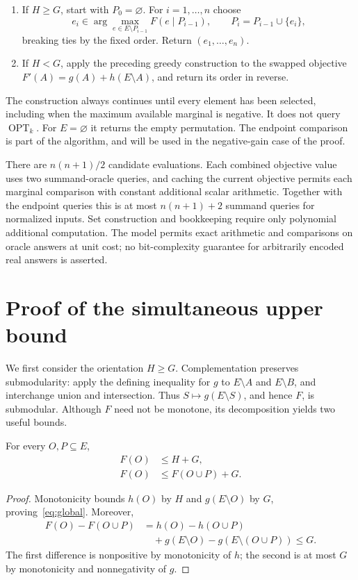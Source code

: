 \documentclass[acmsmall,screen,nonacm,11pt,natbib=false]{acmart}
\newcommand{\OPT}{\operatorname{OPT}}
\begin{document}
\begin{enumerate}
\item If $H\ge G$, start with $P_0=\varnothing$. For $i=1,\ldots,n$ choose
\[
 e_i\in\arg\max_{e\in E\setminus P_{i-1}}F(e\mid P_{i-1}),
 \qquad P_i=P_{i-1}\cup\{e_i\},
\]
breaking ties by the fixed order. Return $(e_1,\ldots,e_n)$.
\item If $H<G$, apply the preceding greedy construction to the swapped
objective $F'(A)=g(A)+h(E\setminus A)$, and return its order in reverse.
\end{enumerate}

The construction always continues until every element has been selected,
including when the maximum available marginal is negative. It does not
query $\OPT_k$. For $E=\varnothing$ it returns the empty permutation.
The endpoint comparison is part of the algorithm, and will be used in the
negative-gain case of the proof.

There are $n(n+1)/2$ candidate evaluations. Each combined objective value
uses two summand-oracle queries, and caching the current objective permits
each marginal comparison with constant additional scalar arithmetic.
Together with the endpoint queries this is at most $n(n+1)+2$ summand
queries for normalized inputs. Set construction and bookkeeping require
only polynomial additional computation. The model permits exact arithmetic
and comparisons on oracle answers at unit cost; no bit-complexity guarantee
for arbitrarily encoded real answers is asserted.

\section{Proof of the simultaneous upper bound}\label{sec:proof}

We first consider the orientation $H\ge G$. Complementation preserves
submodularity: apply the defining inequality for $g$ to $E\setminus A$
and $E\setminus B$, and interchange union and intersection. Thus
$S\mapsto g(E\setminus S)$, and hence $F$, is submodular. Although $F$
need not be monotone, its decomposition yields two useful bounds.

\begin{lemma}\label{lem:budget}
For every $O,P\subseteq E$,
\begin{align}
 F(O)&\le H+G,\label{eq:global}\\
 F(O)&\le F(O\cup P)+G.\label{eq:union}
\end{align}
\end{lemma}
\begin{proof}
Monotonicity bounds $h(O)$ by $H$ and $g(E\setminus O)$ by $G$,
proving~\eqref{eq:global}. Moreover,
\begin{align*}
 F(O)-F(O\cup P)
 &=h(O)-h(O\cup P)\\
 &\quad+g(E\setminus O)-g(E\setminus(O\cup P))\le G.
\end{align*}
The first difference is nonpositive by monotonicity of $h$; the second
is at most $G$ by monotonicity and nonnegativity of $g$.
\end{proof}
\end{document}
